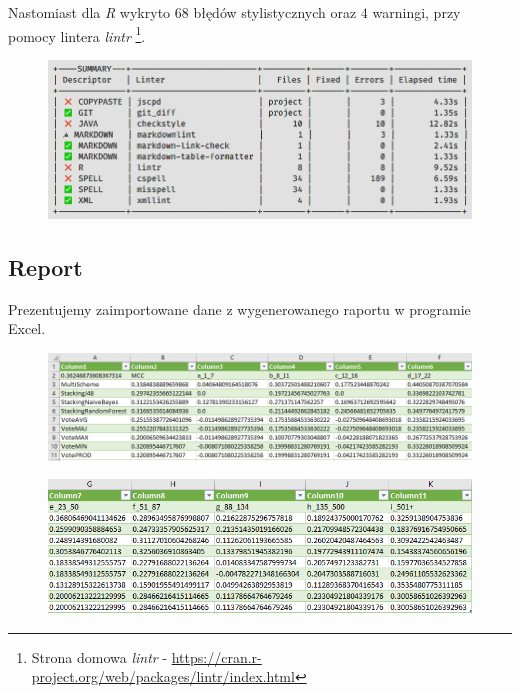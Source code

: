 \documentclass[graybox]{svmult}
\begin{document}
Nastomiast dla \emph{R} wykryto $68$ błędów stylistycznych oraz $4$ warningi, przy pomocy lintera \emph{lintr} \footnote{Strona domowa \emph{lintr} - \url{https://cran.r-project.org/web/packages/lintr/index.html}}.

\begin{figure}[h]
\centering
\includegraphics[width=\linewidth]{img/report_for_m2/m2_2_errors.png}
\end{figure}

\clearpage

\subsection{Report}

Prezentujemy zaimportowane dane z wygenerowanego raportu w programie Excel. \\


\begin{figure}[!h]
\centering
\includegraphics[width=\linewidth]{img/report_for_m2/m2_2_results_1.png}
\end{figure}

\begin{figure}[!h]
\centering
\includegraphics[width=\linewidth]{img/report_for_m2/m2_2_results_2.png}
\end{figure}
\end{document}
